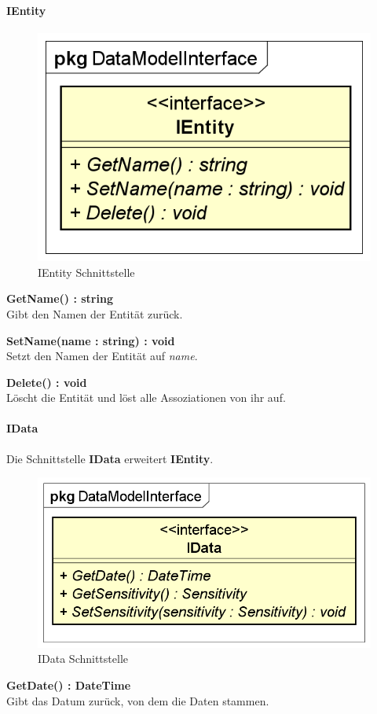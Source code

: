 \documentclass[a4paper]{scrreprt}
\begin{document}
\paragraph{IEntity}
\begin{figure}[H]
\centering
\includegraphics[width=0.45\textheight]{graphics/Klassendiagramme/Model/IEntity.png}
\caption{IEntity Schnittstelle}
\end{figure}
\textbf{GetName() : string}\\
Gibt den Namen der Entität zurück.

\textbf{SetName(name : string) : void}\\
Setzt den Namen der Entität auf \textit{name}.

\textbf{Delete() : void}\\
Löscht die Entität und löst alle Assoziationen von ihr auf.

\paragraph{IData}
Die Schnittstelle \textbf{IData} erweitert \textbf{IEntity}.

\begin{figure}[H]
\centering
\includegraphics[width=0.45\textheight]{graphics/Klassendiagramme/Model/IData.png}
\caption{IData Schnittstelle}
\end{figure}
\textbf{GetDate() : DateTime}\\
Gibt das Datum zurück, von dem die Daten stammen.
\end{document}
